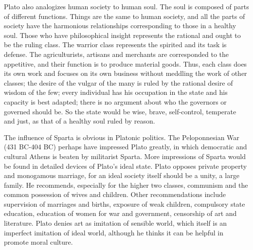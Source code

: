 \documentclass[11pt]{article}
\begin{document}
\begin{sloppypar}
\newline

Plato also analogizes human society to human soul. 
The soul is composed of parts of different functions. 
Things are the same to human society, and all the parts of society have the harmonious relationships corresponding to those in a healthy soul. 
Those who have philosophical insight represents the rational and ought to be the ruling class. 
The warrior class represents the spirited and its task is defense. 
The agriculturists, artisans and merchants are corresponded to the appetitive, and their function is to produce material goods. 
Thus, each class does its own work and focuses on its own business without meddling the work of other classes; 
the desire of the vulgar of the many is ruled by the rational desire of wisdom of the few; 
every individual has his occupation in the state and his capacity is best adapted; 
there is no argument about who the governors or governed should be. 
So the state would be wise, brave, self-control, temperate and just, as that of a healthy soul ruled by reason.

\newline

The influence of Sparta is obvious in Platonic politics. 
The Peloponnesian War (431 BC-404 BC) perhaps have impressed Plato greatly, in which democratic and cultural Athens is beaten by militarist Sparta. 
More impressions of Sparta would be found in detailed devices of Plato’s ideal state. 
Plato opposes private property and monogamous marriage, for an ideal society itself should be a unity, a large family. 
He recommends, especially for the higher two classes, communism and the common possession of wives and children. 
Other recommendations include supervision of marriages and births, exposure of weak children, compulsory state education, education of women for war and government, censorship of art and literature. 
Plato denies art as imitation of sensible world, which itself is an imperfect imitation of ideal world, although he thinks it can be helpful in promote moral culture.

\newline


\end{sloppypar}
\end{document}

